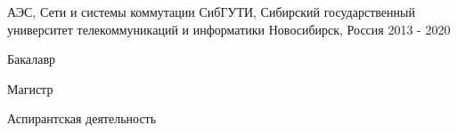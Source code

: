 

\begin{cventries}

  \cventry
    {АЭС, Сети и системы коммутации} %
    {СибГУТИ, Сибирский государственный университет телекоммуникаций и информатики} %
    {Новосибирск, Россия} %
    {2013 - 2020} %
    {
      \begin{cvitems} %
        \item {Бакалавр}
        \item {Магистр}
        \item {Аспирантская деятельность}
      \end{cvitems}
    }
\end{cventries}
